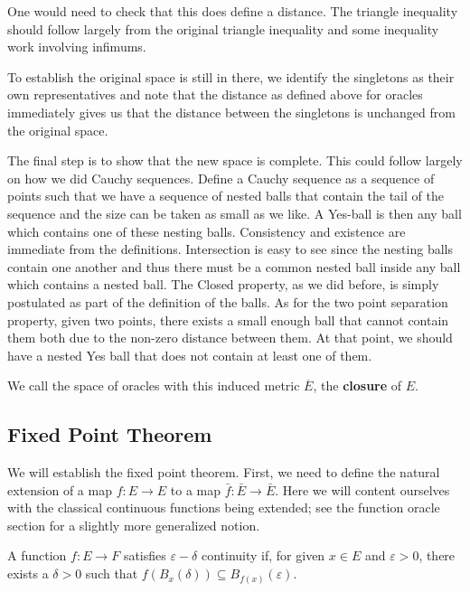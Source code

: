 One would need to check that this does define a distance. The triangle inequality should follow largely from the original triangle inequality and some inequality work involving infimums. 

To establish the original space is still in there, we identify the singletons as their own representatives and note that the distance as defined above for oracles immediately gives us that the distance between the singletons is unchanged from the original space. 

The final step is to show that the new space is complete. This could follow largely on how we did Cauchy sequences. Define a Cauchy sequence as a sequence of points such that we have a sequence of nested balls that contain the tail of the sequence and the size can be taken as small as we like. A Yes-ball is then any ball which contains one of these nesting balls. Consistency and existence are immediate from the definitions. Intersection is easy to see since the nesting balls contain one another and thus there must be a common nested ball inside any ball which contains a nested ball. The Closed property, as we did before, is simply postulated as part of the definition of the balls. As for the two point separation property, given two points, there exists a small enough ball that cannot contain them both due to the non-zero distance between them. At that point, we should have a nested Yes ball that does not contain at least one of them. 

We call the space of oracles with this induced metric $\overline{E}$, the \textbf{closure} of $E$.


\subsection{Fixed Point Theorem}

We will establish the fixed point theorem. First, we need to define the natural extension of a map $f: E \to E$ to a map $\bar{f} : \bar{E} \to \bar{E}$. Here we will content ourselves with the classical continuous functions being extended; see the function oracle section for a slightly more generalized notion. 

\begin{definition}
    A function $f: E \to F$ satisfies $\varepsilon-\delta$ continuity if, for given $x \in E$ and $\varepsilon > 0$, there exists a $\delta > 0$ such that $f(B_{x} (\delta)) \subseteq B_{f(x)} (\varepsilon)$.
\end{definition}

